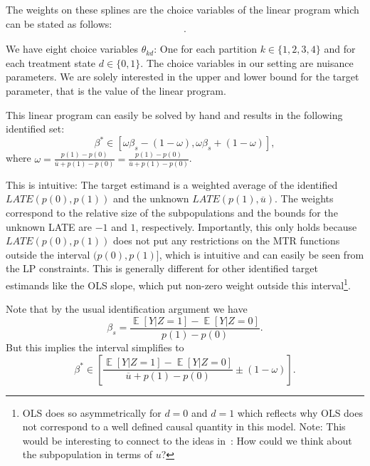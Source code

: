 \documentclass[11pt,a4paper,english]{article} %
\DeclareMathOperator*{\E}{\mathbb{E}}
\numberwithin{equation}{section}
\numberwithin{figure}{section}
\numberwithin{table}{section}
\theoremstyle{definition}
\theoremstyle{remark}
\begin{document}
The weights on these splines are the choice variables of the linear program which can be stated as follows:
\begin{equation}
	[\text{Describe LP}].
\end{equation}

We have eight choice variables $\theta_{kd}$: One for each partition $k\in\{1,2,3,4\}$ and for each treatment state $d\in\{0,1\}$.
The choice variables in our setting are nuisance parameters.
We are solely interested in the upper and lower bound for the target parameter, that is the value of the linear program.


This linear program can easily be solved by hand and results in the following identified set:
\begin{equation}
	\beta^* \in [\omega\beta_s - (1 - \omega), \omega\beta_s + (1 - \omega)],
\end{equation}
where $\omega = \frac{p(1) - p(0)}{\overline{u} + p(1) - p(0)} = \frac{p(1) - p(0)}{\overline{u} + p(1) - p(0)}$.

This is intuitive: The target estimand is a weighted average of the identified $LATE(p(0), p(1))$ and the unknown $LATE(p(1), \overline{u})$.
The weights correspond to the relative size of the subpopulations and the bounds for the unknown LATE are $-1$ and $1$, respectively.
Importantly, this only holds because $LATE(p(0), p(1))$ does not put any restrictions on the MTR functions outside the interval $(p(0), p(1)]$, which is intuitive and can easily be seen from the LP constraints.
This is generally different for other identified target estimands like the OLS slope, which put non-zero weight outside this interval\footnote{OLS does so asymmetrically for $d=0$ and $d=1$ which reflects why OLS does not correspond to a well defined causal quantity in this model. Note: This would be interesting to connect to the ideas in~\cite{poirier2024quantifying}: How could we think about the subpopulation in terms of $u$?}.


Note that by the usual identification argument we have
\begin{equation}
	\beta_s = \frac{\E\left[Y|Z=1\right] - \E\left[Y|Z=0\right]}{p(1) - p(0)}.
\end{equation}
But this implies the interval simplifies to
\begin{equation}
	\beta^* \in \left[\frac{\E\left[Y|Z=1\right] - \E\left[Y|Z=0\right]}{\overline{u} + p(1) - p(0)} \pm (1 - \omega)\right].
\end{equation}
\end{document}
